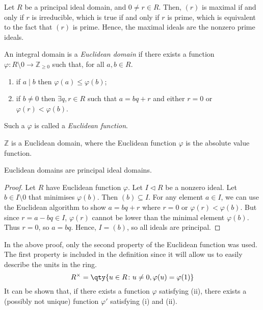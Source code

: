 \begin{remark}
	Let \( R \) be a principal ideal domain, and \( 0 \neq r \in R \).
	Then, \( (r) \) is maximal if and only if \( r \) is irreducible, which is true if and only if \( r \) is prime, which is equivalent to the fact that \( (r) \) is prime.
	Hence, the maximal ideals are the nonzero prime ideals.
\end{remark}
\begin{definition}
	An integral domain is a \textit{Euclidean domain} if there exists a function \( \varphi \colon R \setminus \qty{0} \to \mathbb Z_{\geq 0} \) such that, for all \( a, b \in R \).
	\begin{enumerate}
		\item if \( a \mid b \) then \( \varphi(a) \leq \varphi(b) \);
		\item if \( b \neq 0 \) then \( \exists q, r \in R \) such that \( a = bq + r \) and either \( r = 0 \) or \( \varphi(r) < \varphi(b) \).
	\end{enumerate}
	Such a \( \varphi \) is called a \textit{Euclidean function}.
\end{definition}
\begin{example}
	\( \mathbb Z \) is a Euclidean domain, where the Euclidean function \( \varphi \) is the absolute value function.
\end{example}
\begin{proposition}
	Euclidean domains are principal ideal domains.
\end{proposition}
\begin{proof}
	Let \( R \) have Euclidean function \( \varphi \).
	Let \( I \vartriangleleft R \) be a nonzero ideal.
	Let \( b \in I \setminus \qty{0} \) that minimises \( \varphi(b) \).
	Then \( (b) \subseteq I \).
	For any element \( a \in I \), we can use the Euclidean algorithm to show \( a = bq + r \) where \( r = 0 \) or \( \varphi(r) < \varphi(b) \).
	But since \( r = a - bq \in I \), \( \varphi(r) \) cannot be lower than the minimal element \( \varphi(b) \).
	Thus \( r = 0 \), so \( a = bq \).
	Hence, \( I = (b) \), so all ideals are principal.
\end{proof}
\begin{remark}
	In the above proof, only the second property of the Euclidean function was used.
	The first property is included in the definition since it will allow us to easily describe the units in the ring.
	\[
		R^\times = \qty{u \in R \colon u \neq 0, \varphi(u) = \varphi(1)}
	\]
	It can be shown that, if there exists a function \( \varphi \) satisfying (ii), there exists a (possibly not unique) function \( \varphi' \) satisfying (i) and (ii).
\end{remark}
